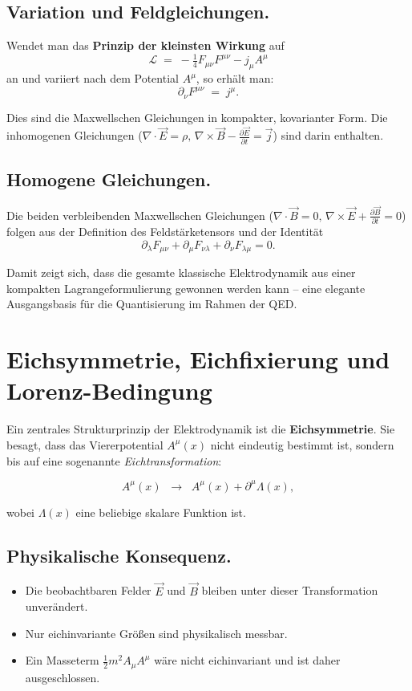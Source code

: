 \subsection*{Variation und Feldgleichungen.}
Wendet man das \textbf{Prinzip der kleinsten Wirkung} auf
\[
\mathcal{L} \;=\; -\tfrac{1}{4} F_{\mu\nu}F^{\mu\nu} - j_\mu A^\mu
\]
an und variiert nach dem Potential \( A^\mu \), so erhält man:
\[
\partial_\nu F^{\mu\nu} \;=\; j^\mu .
\]

Dies sind die Maxwellschen Gleichungen in kompakter, 
kovarianter Form. Die inhomogenen Gleichungen
(\( \nabla \cdot \vec{E} = \rho, \, \nabla \times \vec{B} - \tfrac{\partial \vec{E}}{\partial t} = \vec{j} \))
sind darin enthalten.

\subsection*{Homogene Gleichungen.}
Die beiden verbleibenden Maxwellschen Gleichungen 
(\( \nabla \cdot \vec{B} = 0, \, \nabla \times \vec{E} + \tfrac{\partial \vec{B}}{\partial t} = 0 \))
folgen aus der Definition des Feldstärketensors
und der Identität
\[
\partial_\lambda F_{\mu\nu} + \partial_\mu F_{\nu\lambda} + \partial_\nu F_{\lambda\mu} = 0 .
\]

\medskip
Damit zeigt sich, dass die gesamte klassische Elektrodynamik 
aus einer kompakten Lagrangeformulierung gewonnen werden kann – 
eine elegante Ausgangsbasis für die Quantisierung im Rahmen der QED.
\section{Eichsymmetrie, Eichfixierung und Lorenz-Bedingung}
\label{anhangA:eichsymmetrie}

Ein zentrales Strukturprinzip der Elektrodynamik ist die \textbf{Eichsymmetrie}.
Sie besagt, dass das Viererpotential \( A^\mu(x) \) nicht eindeutig bestimmt ist,
sondern bis auf eine sogenannte \emph{Eichtransformation}:

\[
A^\mu(x) \;\;\rightarrow\;\; A^\mu(x) + \partial^\mu \Lambda(x),
\]

wobei \( \Lambda(x) \) eine beliebige skalare Funktion ist.

\subsection*{Physikalische Konsequenz.}
\begin{itemize}
	\item Die beobachtbaren Felder \( \vec{E} \) und \( \vec{B} \) 
	bleiben unter dieser Transformation unverändert.
	\item Nur eichinvariante Größen sind physikalisch messbar.
	\item Ein Masseterm \( \tfrac{1}{2} m^2 A_\mu A^\mu \) 
	wäre nicht eichinvariant und ist daher ausgeschlossen.
\end{itemize}

